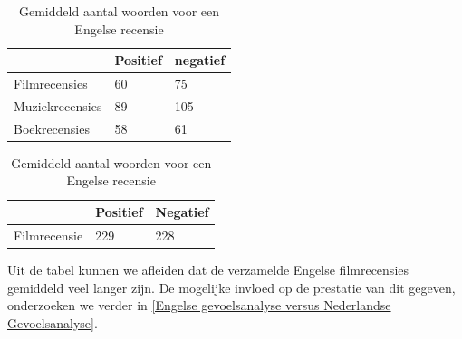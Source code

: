 \begin{table}[h]
\centering
\setlength\tabcolsep{2pt}
\begin{minipage}[t]{0.48\textwidth}
\centering
\label{tabel: Gemiddeld aantal woorden per recensie Nederlands}
\begin{tabular}{l|l|l|}
\cline{2-3}
                & Positief & negatief \\ \hline
\multicolumn{1}{|l|}{Filmrecensies}   & 60       & 75       \\ \hline
\multicolumn{1}{|l|}{Muziekrecensies} & 89       & 105      \\ \hline
\multicolumn{1}{|l|}{Boekrecensies}   & 58       & 61    \\ \hline   
\end{tabular}

\caption{Gemiddeld aantal woorden voor een Nederlandse recensie} 
\end{minipage}%
\hfill
\begin{minipage}[t]{0.48\textwidth}
\centering
\label{tabel: Gemiddeld aantal woorden per recensie Engels}
\begin{tabular}{l|l|l|}
\cline{2-3}
                                   & Positief & Negatief \\ \hline
\multicolumn{1}{|l|}{Filmrecensie} & 229      & 228      \\ \hline
\end{tabular}
\caption{Gemiddeld aantal woorden voor een Engelse recensie}
\end{minipage}
\end{table} 

Uit de tabel kunnen we afleiden dat de verzamelde Engelse filmrecensies gemiddeld veel langer zijn. De mogelijke invloed op de prestatie van dit gegeven, onderzoeken we verder in \ref{Engelse gevoelsanalyse versus Nederlandse Gevoelsanalyse}.


